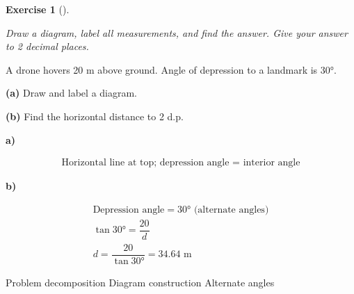 \documentclass[
  letterpaper,
  DIV=11,
  numbers=noendperiod]{scrreprt}
\theoremstyle{definition}
\newtheorem{exercise}{Exercise}[chapter]
\theoremstyle{remark}
\begin{document}
\begin{exercise}[]\protect\hypertarget{exr-trig-16}{}\label{exr-trig-16}

\emph{Draw a diagram, label all measurements, and find the answer. Give
your answer to 2 decimal places.}

A drone hovers 20 m above ground. Angle of depression to a landmark is
30°.

\textbf{(a)} Draw and label a diagram.

\textbf{(b)} Find the horizontal distance to 2 d.p.

\begin{tcolorbox}[enhanced jigsaw, opacitybacktitle=0.6, coltitle=black, arc=.35mm, colframe=quarto-callout-tip-color-frame, colback=white, bottomrule=.15mm, left=2mm, colbacktitle=quarto-callout-tip-color!10!white, titlerule=0mm, opacityback=0, title=\textcolor{quarto-callout-tip-color}{\faLightbulb}\hspace{0.5em}{🔍 View Solution}, leftrule=.75mm, breakable, rightrule=.15mm, bottomtitle=1mm, toptitle=1mm, toprule=.15mm]

\textbf{a)}

\[
\begin{aligned}
\text{Horizontal line at top; depression angle = interior angle}
\end{aligned}
\]

\textbf{b)}

\[
\begin{aligned}
\text{Depression angle} = 30° \text{ (alternate angles)} \\ \tan 30° = \dfrac{20}{d} \\ d = \dfrac{20}{\tan 30°} = 34.64 \text{ m}
\end{aligned}
\]

\end{tcolorbox}

{Problem decomposition} {Diagram construction} {Alternate angles}

\end{exercise}
\end{document}
